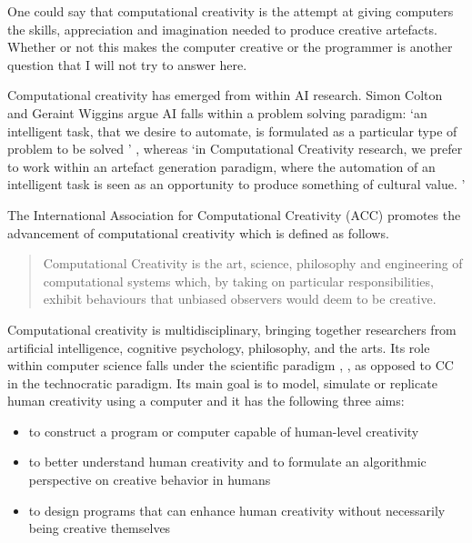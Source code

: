 \begin{draft}
  One could say that computational creativity is the attempt at giving computers the skills, appreciation and imagination needed to produce creative artefacts. Whether or not this makes the computer creative or the programmer is another question that I will not try to answer here.
\end{draft}

Computational creativity has emerged from within \ac{AI} research. Simon Colton and Geraint Wiggins argue \ac{AI} falls within a problem solving paradigm: `an intelligent task, that we desire to automate, is formulated as a particular type of problem to be solved ' \autocite[p.2]{Colton2012}, whereas `in Computational Creativity research, we prefer to work within an artefact generation paradigm, where the automation of an intelligent task is seen as an opportunity to produce something of cultural value. ' \autocite[p.2, my emphasis]{Colton2012}

The International Association for Computational Creativity (ACC)  promotes the advancement of computational creativity which is defined as follows.

\begin{quotation}
  Computational Creativity is the art, science, philosophy and engineering of computational systems which, by taking on particular responsibilities, exhibit behaviours that unbiased observers would deem to be creative. 
\end{quotation}

Computational creativity is multidisciplinary, bringing together researchers from artificial intelligence, cognitive psychology, philosophy, and the arts. Its role within computer science falls under the scientific paradigm \autocite[p.8]{Hugill2013}, \autocite[see also][]{Eden2007}, as opposed to \ac{CC} in the technocratic paradigm. Its main goal is to model, simulate or replicate human creativity using a computer and it has the following three aims:

\begin{itemize}
  \item to construct a program or computer capable of human-level creativity
  \item to better understand human creativity and to formulate an algorithmic perspective on creative behavior in humans
  \item to design programs that can enhance human creativity without necessarily being creative themselves
\end{itemize}

